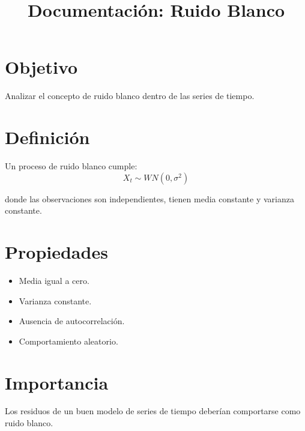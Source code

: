\documentclass[11pt]{article}
\title{Documentación: Ruido Blanco}
\date{}
\begin{document}
\maketitle

\section{Objetivo}
Analizar el concepto de ruido blanco dentro de las series de tiempo.

\section{Definición}
Un proceso de ruido blanco cumple:
\[
X_t \sim WN(0,\sigma^2)
\]

donde las observaciones son independientes, tienen media constante y varianza constante.

\section{Propiedades}
\begin{itemize}
\item Media igual a cero.
\item Varianza constante.
\item Ausencia de autocorrelación.
\item Comportamiento aleatorio.
\end{itemize}

\section{Importancia}
Los residuos de un buen modelo de series de tiempo deberían comportarse como ruido blanco.
\end{document}
